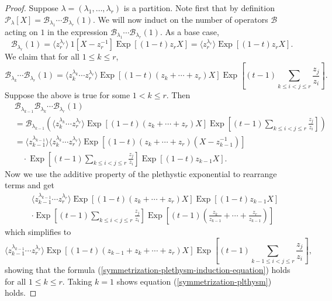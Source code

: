 \documentclass[11pt]{article}
\theoremstyle{definition}
\numberwithin{equation}{section}
\DeclareMathOperator{\EXP}{\mathrm{Exp}}
\begin{document}
\begin{proof}
Suppose $\lambda = (\lambda_1,\ldots, \lambda_r)$ is a partition.    
Note first that by definition $ \mathcal{P}_{\lambda}[X] = \mathscr{B}_{\lambda_1}\cdots \mathscr{B}_{\lambda_r}(1).$ We will now induct on the number of operators $\mathscr{B}$ acting on $1$ in the expression $\mathscr{B}_{\lambda_1}\cdots \mathscr{B}_{\lambda_r}(1).$ As a base case,  
\[\mathscr{B}_{\lambda_r}(1) = \langle z_r ^{\lambda_r} \rangle ~1[X-z_{r}^{-1}]\EXP[(1-t)z_rX] = \langle z_r ^{\lambda_r} \rangle \EXP[(1-t)z_rX].\]
We claim that for all $1\leq k \leq r$,
\begin{equation} \label{symmetrization-plethysm-induction-equation}
    \mathscr{B}_{\lambda_k}\cdots \mathscr{B}_{\lambda_r}(1) = \langle z_{k}^{\lambda_{k}} \cdots z_r^{\lambda_r} \rangle \EXP[(1-t)(z_k+\cdots +z_r)X]\EXP\left[(t-1)\sum_{k\leq i<j\leq r}\frac{z_j}{z_i}\right].
\end{equation}
Suppose the above is true for some $1< k \leq r$. Then 
\begin{align*}
    &\mathscr{B}_{\lambda_{k-1}}\mathscr{B}_{\lambda_k}\cdots \mathscr{B}_{\lambda_r}(1)  \\
    &= \mathscr{B}_{\lambda_{k-1}} \left( \langle z_{k}^{\lambda_{k}} \cdots z_r^{\lambda_r} \rangle \EXP[(1-t)(z_k+\cdots +z_r)X]\EXP\left[(t-1)\sum_{k\leq i<j\leq r}\frac{z_j}{z_i}\right] \right) \\
   &=  \langle z_{k-1}^{\lambda_{k-1}} \rangle  \langle z_{k}^{\lambda_{k}} \cdots z_r^{\lambda_r} \rangle \EXP[(1-t)(z_k+\cdots +z_r)(X-z_{k-1}^{-1})] \\ &\quad  \cdot \EXP\left[(t-1)\sum_{k\leq i<j\leq r}\frac{z_j}{z_i}\right] \EXP[(1-t)z_{k-1}X].
\end{align*}
Now we use the additive property of the plethystic exponential to rearrange terms and get
\begin{equation*}
\begin{split}
    &\langle z_{k-1}^{\lambda_{k-1}} \cdots z_r^{\lambda_r} \rangle \EXP\left[(1-t)(z_k+\cdots +z_r)X\right] \EXP[(1-t)z_{k-1}X] \\
    &\cdot \EXP\left[(t-1)\sum_{k\leq i<j\leq r}\frac{z_j}{z_i}\right]\EXP\left[(t-1)\left(\frac{z_k}{z_{k-1}}+\cdots +\frac{z_r}{z_{k-1}}\right)\right]
\end{split}
\end{equation*}
    which simplifies to 
$$ \langle z_{k-1}^{\lambda_{k-1}} \cdots z_r^{\lambda_r} \rangle \EXP[(1-t)(z_{k-1}+z_k+\cdots +z_r)X] \EXP\left[(t-1)\sum_{k-1\leq i<j\leq r}\frac{z_j}{z_i}\right],$$ showing that the formula (\ref{symmetrization-plethysm-induction-equation}) holds for all $1\leq k\leq r$. Taking $k=1$ shows equation (\ref{symmetrization-plthysm}) holds.
\end{proof}
\end{document}
